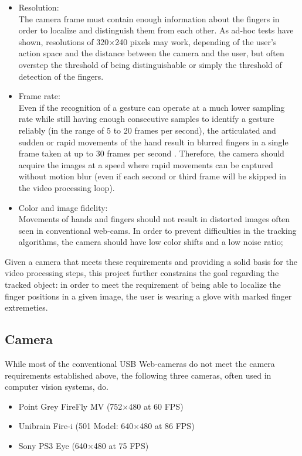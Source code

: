 \begin{itemize}
\item Resolution: \\ The camera frame must contain enough information about the fingers in order to localize and distinguish them from each other. As ad-hoc tests have shown, resolutions of 320$\times$240 pixels may work, depending of the user's action space and the distance between the camera and the user, but often overstep the threshold of being distinguishable or simply the threshold of detection of the fingers.

\item Frame rate: \\ Even if the recognition of a gesture can operate at a much lower sampling rate while still having enough consecutive samples to identify a gesture reliably (in the range of 5 to 20 frames per second), the articulated and sudden or rapid movements of the hand result in blurred fingers in a single frame taken at up to 30 frames per second \cite{blurry}. Therefore, the camera should acquire the images at a speed where rapid movements can be captured without motion blur (even if each second or third frame will be skipped in the video processing loop).

\item Color and image fidelity: \\ Movements of hands and fingers should not result in distorted images often seen in conventional web-cams. In order to prevent difficulties in the tracking algorithms, the 
camera should have low color shifts and a low noise ratio;
\end{itemize}

Given a camera that meets these requirements and providing a solid basis for the video processing steps, this project further constrains the goal regarding the tracked object: in order to meet the requirement of being able to localize the finger positions in a given image, the user is wearing a glove with marked finger extremeties.

\subsection{Camera}
\label{sub:camera}

While most of the conventional USB Web-cameras do not meet the camera requirements established above, the following three cameras, often used in computer vision systems, do.
\begin{itemize}
\item Point Grey FireFly MV (752$\times$480 at 60 FPS) \cite{pointgrey}
\item Unibrain Fire-i (501 Model: 640$\times$480 at 86 FPS) \cite{unibrain}
\item Sony PS3 Eye (640$\times$480 at 75 FPS) \cite{ps3eye}
\end{itemize}

